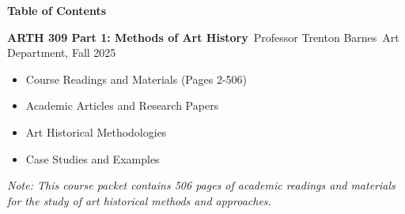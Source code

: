 \documentclass[12pt]{article}
\begin{document}
\begin{center}
{\color{williamsblue} \fontsize{20}{24}\selectfont \textbf{Table of Contents}}
\end{center}

\vspace{0.5in}

{\fontsize{14}{18}\selectfont
\textbf{ARTH 309 Part 1: Methods of Art History}\
Professor Trenton Barnes\
Art Department, Fall 2025
}

\vspace{0.3in}

\begin{itemize}
\item Course Readings and Materials (Pages 2-506)
\item Academic Articles and Research Papers
\item Art Historical Methodologies
\item Case Studies and Examples
\end{itemize}

\vspace{0.5in}

{\fontsize{12}{16}\selectfont
\textit{Note: This course packet contains 506 pages of academic readings and materials for the study of art historical methods and approaches.}
}
\end{document}
